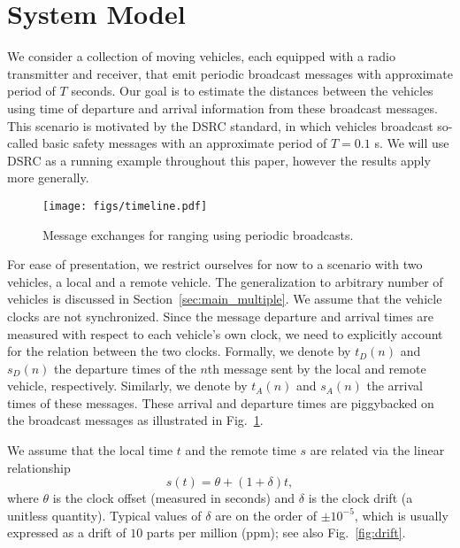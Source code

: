 \documentclass[12pt,journal,final,onecolumn]{IEEEtran}
\theoremstyle{definition}
\theoremstyle{myremark}
\begin{document}
\section{System Model}
\label{sec:system}

We consider a collection of moving vehicles, each equipped with a radio
transmitter and receiver, that emit periodic broadcast messages with approximate
period of $T$ seconds. Our goal is to estimate the distances between the
vehicles using time of departure and arrival information from these broadcast
messages. This scenario is motivated by the DSRC standard, in which vehicles
broadcast so-called basic safety messages with an approximate period of $T =
0.1$ s. We will use DSRC as a running example throughout this paper, however the
results apply more generally.

\begin{figure}[htbp]
    \centering 
    \texttt{[image: figs/timeline.pdf]} 

    \caption{Message exchanges for ranging using periodic broadcasts.}
    \label{fig:timeline}
\end{figure}

For ease of presentation, we restrict ourselves for now to a scenario with two
vehicles, a local and a remote vehicle. The generalization to arbitrary number
of vehicles is discussed in Section~\ref{sec:main_multiple}. We assume that the
vehicle clocks are not synchronized. Since the message departure and arrival
times are measured with respect to each vehicle's own clock, we need to
explicitly account for the relation between the two clocks. Formally, we denote
by $t_D(n)$ and $s_D(n)$ the departure times of the $n$\/th message sent by the
local and remote vehicle, respectively. Similarly, we denote by $t_A(n)$ and
$s_A(n)$ the arrival times of these messages. These arrival and departure times
are piggybacked on the broadcast messages as illustrated in
Fig.~\ref{fig:timeline}.

We assume that the local time $t$ and the remote time $s$ are related via the
linear relationship
\begin{equation}
    \label{eq:clock}
    s(t) = \theta + (1+\delta)t,
\end{equation}
where $\theta$ is the clock offset (measured in seconds) and $\delta$ is the
clock drift (a unitless quantity). Typical values of $\delta$ are on the
order of $\pm 10^{-5}$, which is usually expressed as a drift of $10$ parts per
million (ppm); see also Fig.~\ref{fig:drift}. 
\end{document}

